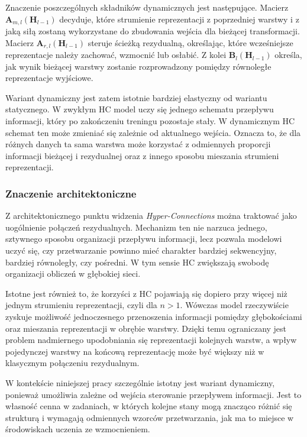 Znaczenie poszczególnych składników dynamicznych jest następujące. Macierz
\(\mathbf{A}_{m,l}(\mathbf{H}_{l-1})\) decyduje, które strumienie reprezentacji
z poprzedniej warstwy i z jaką siłą zostaną wykorzystane do zbudowania wejścia
dla bieżącej transformacji. Macierz \(\mathbf{A}_{r,l}(\mathbf{H}_{l-1})\) steruje
ścieżką rezydualną, określając, które wcześniejsze reprezentacje należy zachować,
wzmocnić lub osłabić. Z kolei \(\mathbf{B}_l(\mathbf{H}_{l-1})\) określa, jak wynik
bieżącej warstwy zostanie rozprowadzony pomiędzy równoległe reprezentacje wyjściowe.

Wariant dynamiczny jest zatem istotnie bardziej elastyczny od wariantu statycznego.
W zwykłym HC model uczy się jednego schematu przepływu informacji, który po zakończeniu
treningu pozostaje stały. W dynamicznym HC schemat ten może zmieniać się zależnie od
aktualnego wejścia. Oznacza to, że dla różnych danych ta sama warstwa może korzystać
z odmiennych proporcji informacji bieżącej i rezydualnej oraz z innego sposobu mieszania
strumieni reprezentacji.

\subsubsection*{Znaczenie architektoniczne}

Z architektonicznego punktu widzenia \textit{Hyper-Connections} można traktować jako
uogólnienie połączeń rezydualnych. Mechanizm ten nie narzuca jednego, sztywnego sposobu
organizacji przepływu informacji, lecz pozwala modelowi uczyć się, czy przetwarzanie
powinno mieć charakter bardziej sekwencyjny, bardziej równoległy, czy pośredni.
W tym sensie HC zwiększają swobodę organizacji obliczeń w głębokiej sieci.

Istotne jest również to, że korzyści z HC pojawiają się dopiero przy więcej niż jednym
strumieniu reprezentacji, czyli dla \(n > 1\). Wówczas model rzeczywiście zyskuje
możliwość jednoczesnego przenoszenia informacji pomiędzy głębokościami oraz mieszania
reprezentacji w obrębie warstwy. Dzięki temu ograniczany jest problem nadmiernego
upodobniania się reprezentacji kolejnych warstw, a wpływ pojedynczej warstwy na końcową
reprezentację może być większy niż w klasycznym połączeniu rezydualnym.

W kontekście niniejszej pracy szczególnie istotny jest wariant dynamiczny, ponieważ
umożliwia zależne od wejścia sterowanie przepływem informacji. Jest to własność cenna
w zadaniach, w których kolejne stany mogą znacząco różnić się strukturą i wymagają
odmiennych wzorców przetwarzania, jak ma to miejsce w środowiskach uczenia ze
wzmocnieniem.

